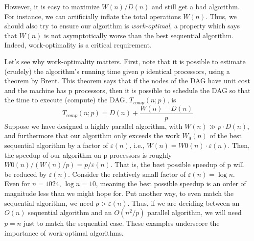 \documentclass[twocolumn]{article}
\begin{document}
However, it is easy to maximize $W(n)/D(n)$ and still get a bad algorithm. 
For instance, we can artificially inflate the total operations $W (n)$. 
Thus, we should also try to ensure our algorithm is \textit{work-optimal}, a property which says that $W (n)$ is not asymptotically worse than the best sequential algorithm. Indeed, work-optimality is a critical requirement.

Let’s see why work-optimality matters. 
First, note that it is possible to estimate (crudely) the algorithm’s running time given $p$ identical processors, using a theorem by Brent. This theorem says that if the nodes of the DAG have unit cost and the machine has p processors, then it is possible to schedule the DAG so that the time to execute (compute) the DAG, $T_{comp}(n; p)$, is
\begin{equation}
T_{comp}(n; p) = D(n) + \frac{W(n) - D(n)}{p}
\label{eqn:cost}
\end{equation}
Suppose we have designed a highly parallel algorithm, with $W (n) \gg p \cdot D(n)$, and furthermore that our algorithm only exceeds the work $W_0(n)$ of the best sequential algorithm by a factor of $\varepsilon(n)$, i.e., $W(n) = W0(n) \cdot \varepsilon(n)$. 
Then, the speedup of our algorithm on p processors is roughly $W0(n)/(W(n)/p)=p/\varepsilon(n)$.
That is, the best possible speedup of p will be reduced by $\varepsilon(n)$.
Consider the relatively small factor of $\varepsilon(n) = \log n$. Even for $n = 1024$, $\log n = 10$, meaning the best possible speedup is an order of magnitude less than we might hope for. 
Put another way, to even match the sequential algorithm, we need $p >\varepsilon(n)$. 
Thus, if we are deciding between an $O(n)$ sequential algorithm and an $O(n^2/p)$ parallel algorithm, we will need $p = n$ just to match the sequential case. These examples underscore the importance of work-optimal algorithms.
\end{document}

